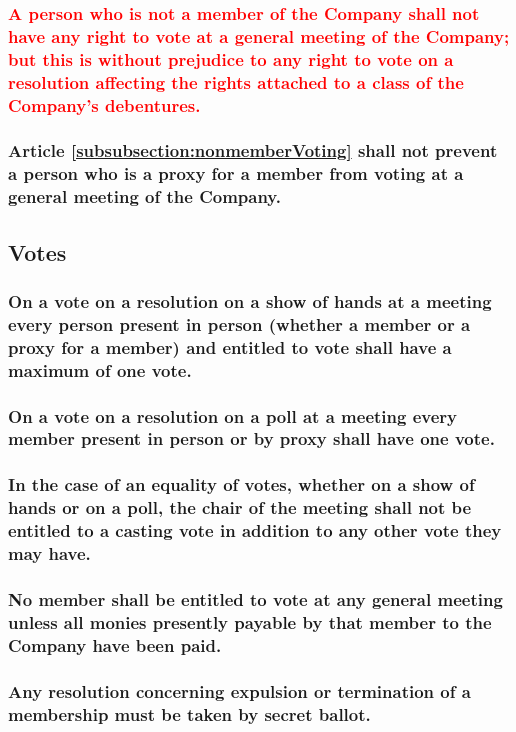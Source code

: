\documentclass[12pt]{article}
\begin{document}
\subsubsection{\textcolor{red}{\label{subsubsection:nonmemberVoting}A person who is not a member of the Company shall not have any right to vote at a general meeting of the Company; but this is without prejudice to any right to vote on a resolution affecting the rights attached to a class of the Company's debentures.}}
\subsubsection{Article \ref{subsubsection:nonmemberVoting} shall not prevent a person who is a proxy for a member from voting at a general meeting of the Company.}

\subsection{Votes}
\subsubsection{On a vote on a resolution on a show of hands at a meeting every person present in person (whether a member or a proxy for a member) and entitled to vote shall have a maximum of one vote.}
\subsubsection{On a vote on a resolution on a poll at a meeting every member present in person or by proxy shall have one vote.}
\subsubsection{In the case of an equality of votes, whether on a show of hands or on a poll, the chair of the meeting shall not be entitled to a casting vote in addition to any other vote they may have.}
\subsubsection{No member shall be entitled to vote at any general meeting unless all monies presently payable by that member to the Company have been paid.}
\subsubsection{Any resolution concerning expulsion or termination of a membership must be taken by secret ballot.}
\end{document}
